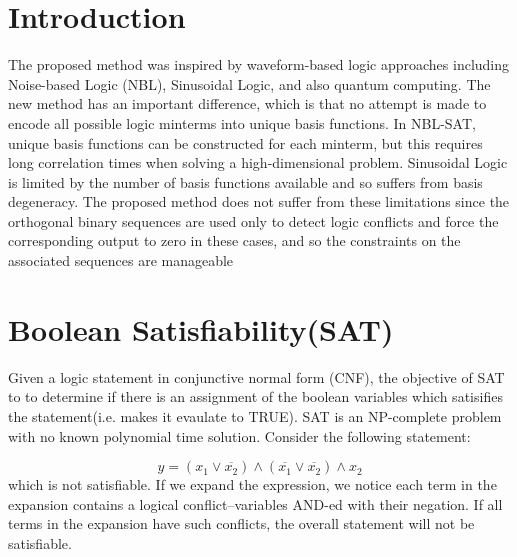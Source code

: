 \documentclass[reqno]{amsart}
\theoremstyle{definition}
\theoremstyle{remark}
\begin{document}
 \maketitle




\section{Introduction}
\noindent
The proposed method was inspired by waveform-based logic approaches including Noise-based Logic (NBL), Sinusoidal Logic, and also quantum computing. The new method has an important difference, which is that no attempt is made to encode all possible logic minterms into unique basis functions. In NBL-SAT, unique basis functions can be constructed for each minterm, but this requires long correlation times when solving a high-dimensional problem. Sinusoidal Logic is limited by the number of basis functions available and so suffers from basis degeneracy. The proposed method does not suffer from these limitations since the orthogonal binary sequences are used only to detect logic conflicts and force the corresponding output to zero in these cases, and so the constraints on the associated sequences are manageable


\section{Boolean Satisfiability(SAT)}
Given a logic statement in conjunctive normal form (CNF), the objective of SAT to to determine if there is an assignment of the boolean variables which satisifies the statement(i.e. makes it evaulate to TRUE). SAT is an NP-complete problem with no known polynomial time solution.  
\newline
\noindent
Consider the following statement:

\begin{equation}
y = (x_1\vee \overline{x_2})\wedge (\overline{x_1}\vee \overline{x_2})\wedge x_2
\end{equation}
\newline
\noindent
which is not satisfiable.  If we expand the expression, we notice each term in the expansion contains a logical conflict--variables AND-ed with their negation. If all terms in the expansion have such conflicts, the overall statement will not be satisfiable.
\end{document}
